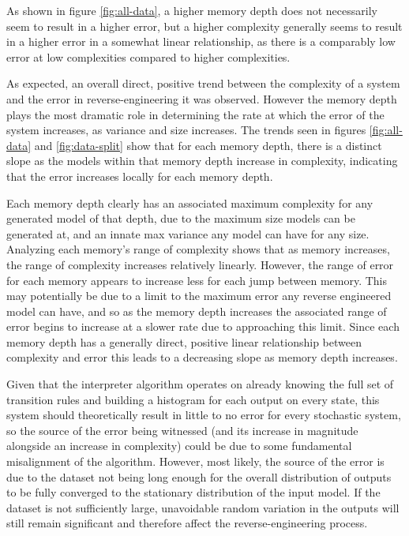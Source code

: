 \documentclass[12pt]{article}
\begin{document}
As shown in figure \ref{fig:all-data}, a higher memory depth does not necessarily seem to result in a higher error, but a higher complexity generally seems to result in a higher error in a somewhat linear relationship, as there is a comparably low error at low complexities compared to higher complexities.

As expected, an overall direct, positive trend between the complexity of a system and the error in reverse-engineering it was observed. However the memory depth plays the most dramatic role in determining the rate at which the error of the system increases, as variance and size increases. The trends seen in figures \ref{fig:all-data} and \ref{fig:data-split} show that for each memory depth, there is a distinct slope as the models within that memory depth increase in complexity, indicating that the error increases locally for each memory depth.

Each memory depth clearly has an associated maximum complexity for any generated model of that depth, due to the maximum size models can be generated at, and an innate max variance any model can have for any size. Analyzing each memory's range of complexity shows that as memory increases, the range of complexity increases relatively linearly. However, the range of error for each memory appears to increase less for each jump between memory. This may potentially be due to a limit to the maximum error any reverse engineered model can have, and so as the memory depth increases the associated range of error begins to increase at a slower rate due to approaching this limit. Since each memory depth has a generally direct, positive linear relationship between complexity and error this leads to a decreasing slope as memory depth increases. 

Given that the interpreter algorithm operates on already knowing the full set of transition rules and building a histogram for each output on every state, this system should theoretically result in little to no error for every stochastic system, so the source of the error being witnessed (and its increase in magnitude alongside an increase in complexity) could be due to some fundamental misalignment of the algorithm. However, most likely, the source of the error is due to the dataset not being long enough for the overall distribution of outputs to be fully converged to the stationary distribution of the input model. If the dataset is not sufficiently large, unavoidable random variation in the outputs will still remain significant and therefore affect the reverse-engineering process.
\end{document}
